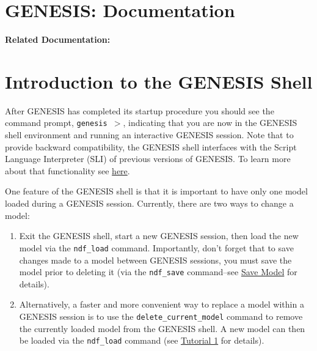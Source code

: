\documentclass[12pt]{article}
\begin{document}
\section*{GENESIS: Documentation}

{\bf Related Documentation:}

\section*{Introduction to the GENESIS Shell}

After GENESIS has completed its startup procedure you should see the command prompt, {\tt genesis $>$}, indicating that you are now in the GENESIS shell environment and running an interactive GENESIS session. Note that to provide backward compatibility, the GENESIS shell interfaces with the Script Language Interpreter (SLI) of previous versions of GENESIS. To learn more about that functionality see \href{../backward-compatibility/backward-compatibility.tex}{here}.

One feature of the GENESIS shell is that it is important to have only one model loaded during a GENESIS session. Currently, there are two ways to change a model:

\begin{enumerate}

\item Exit the GENESIS shell, start a new GENESIS session, then load the new model  via the {\tt ndf\_load} command. Importantly, don't forget that to save changes made to a model between GENESIS sessions, you must save the model prior to deleting it (via the {\tt ndf\_save} command--see \href{../tutorial1/tutorial1.tex}{Save Model} for details).

\item Alternatively, a faster and more convenient way to replace a model within a GENESIS session is to use the {\tt delete\_current\_model} command to remove the currently loaded model from the GENESIS shell. A new model can then be loaded via the {\tt ndf\_load} command (see \href{../tutorial1/tutorial1.tex}{Tutorial 1} for details).

\end{enumerate}
\end{document}
